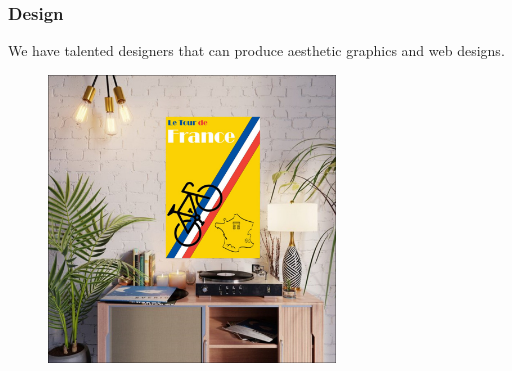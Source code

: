 \subsubsection{Design}

We have talented designers that can produce aesthetic graphics and web designs. 

\begin{figure}[H]
  \centering
  \includegraphics[height=3in]{tdf.jpg}
\end{figure}